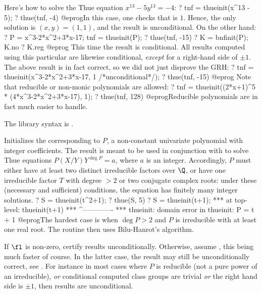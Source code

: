 Here's how to solve the Thue equation $x^{13} - 5y^{13} = - 4$:
\bprog
? tnf = thueinit(x^13 - 5);
? thue(tnf, -4)
@eprog\noindent In this case, one checks that 
is $1$. Hence, the only solution is $(x,y) = (1,1)$, and the result is
unconditional. On the other hand:
\bprog
? P = x^3-2*x^2+3*x-17; tnf = thueinit(P);
? thue(tnf, -15)
? K = bnfinit(P); K.no
? K.reg
@eprog
This time the result is conditional. All results computed using this
particular  are likewise conditional, \emph{except} for a right-hand
side of $\pm 1$.
The above result is in fact correct, so we did not just disprove the GRH:
\bprog
? tnf = thueinit(x^3-2*x^2+3*x-17, 1 /*unconditional*/);
? thue(tnf, -15)
@eprog
Note that reducible or non-monic polynomials are allowed:
\bprog
? tnf = thueinit((2*x+1)^5 * (4*x^3-2*x^2+3*x-17), 1);
? thue(tnf, 128)
@eprog\noindent Reducible polynomials are in fact much easier to handle.

The library syntax is .

\label{se:thueinit}
Initializes the  corresponding to $P$, a non-constant
univariate polynomial with integer coefficients.
The result is meant to be used in conjunction with  to solve Thue
equations $P(X / Y)Y^{\deg P} = a$, where $a$ is an integer. Accordingly,
$P$ must either have at least two distinct irreducible factors over $\Q$,
or have one irreducible factor $T$ with degree $>2$ or two conjugate
complex roots: under these (necessary and sufficient) conditions, the
equation has finitely many integer solutions.
\bprog
? S = thueinit(t^2+1);
? thue(S, 5)
? S = thueinit(t+1);
 ***   at top-level: thueinit(t+1)
 ***                 ^-------------
 *** thueinit: domain error in thueinit: P = t + 1
@eprog\noindent The hardest case is when $\deg P > 2$ and $P$ is irreducible
with at least one real root. The routine then uses Bilu-Hanrot's algorithm.

If $\fl$ is non-zero, certify results unconditionally. Otherwise, assume
, this being much faster of course. In the latter case, the result
may still be unconditionally correct, see . For instance in most
cases where $P$ is reducible (not a pure power of an irreducible), \emph{or}
conditional computed class groups are trivial \emph{or} the right hand side
is $\pm1$, then results are unconditional.

